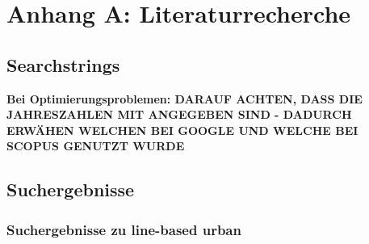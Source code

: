 \chapter{Anhang A: Literaturrecherche}
\section{Searchstrings}

\textbf{Bei Optimierungsproblemen: DARAUF ACHTEN, DASS DIE JAHRESZAHLEN MIT ANGEGEBEN SIND - DADURCH ERWÄHEN WELCHEN BEI GOOGLE UND WELCHE BEI SCOPUS GENUTZT WURDE}

\section{Suchergebnisse}
\subsection{Suchergebnisse zu line-based urban}
